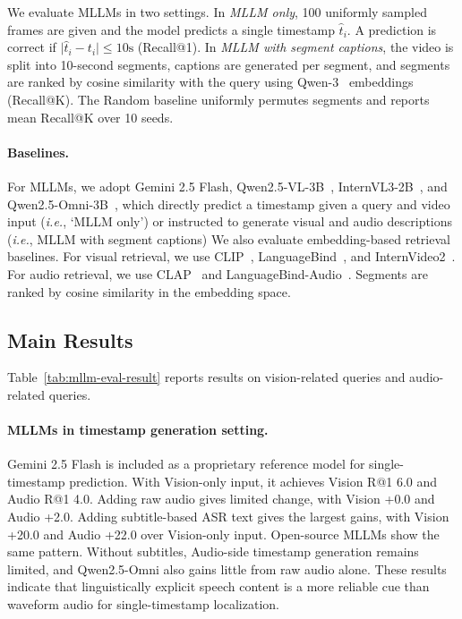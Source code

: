 \documentclass[11pt]{article}
\newcommand{\ie}{\emph{i.e.}}
\begin{document}
We evaluate MLLMs in two settings. In \textit{MLLM only}, 100 uniformly sampled frames are given and the model predicts a single timestamp $\hat{t}_i$. A prediction is correct if $\lvert \hat{t}_i - t_i \rvert \leq 10\mathrm{s}$ (Recall@1). 
In \textit{MLLM with segment captions}, the video is split into 10-second segments, captions are generated per segment, and segments are ranked by cosine similarity with the query using Qwen-3~\cite{qwen3} embeddings (Recall@K). 
The Random baseline uniformly permutes segments and reports mean Recall@K over 10 seeds.

\paragraph{Baselines.}
For MLLMs, we adopt Gemini 2.5 Flash, Qwen2.5-VL-3B~\cite{qwen25}, InternVL3-2B~\cite{internvl3}, and Qwen2.5-Omni-3B~\cite{qwen2.5omni}, which directly predict a timestamp given a query and video input (\ie, `MLLM only') or instructed to generate visual and audio descriptions (\ie, MLLM with segment captions)
We also evaluate embedding-based retrieval baselines. For visual retrieval, we use CLIP~\cite{clip}, LanguageBind~\cite{languagebind}, and InternVideo2~\cite{internvideo2}. For audio retrieval, we use CLAP~\cite{clap} and LanguageBind-Audio~\cite{languagebind}. Segments are ranked by cosine similarity in the embedding space.

\subsection{Main Results}
Table~\ref{tab:mllm-eval-result} reports results on vision-related queries and audio-related queries.
\paragraph{MLLMs in timestamp generation setting.}
Gemini 2.5 Flash is included as a proprietary reference model for single-timestamp prediction. With Vision-only input, it achieves Vision R@1 6.0 and Audio R@1 4.0. Adding raw audio gives limited change, with Vision +0.0 and Audio +2.0. Adding subtitle-based ASR text gives the largest gains, with Vision +20.0 and Audio +22.0 over Vision-only input. Open-source MLLMs show the same pattern. Without subtitles, Audio-side timestamp generation remains limited, and Qwen2.5-Omni also gains little from raw audio alone. These results indicate that linguistically explicit speech content is a more reliable cue than waveform audio for single-timestamp localization.
\end{document}
